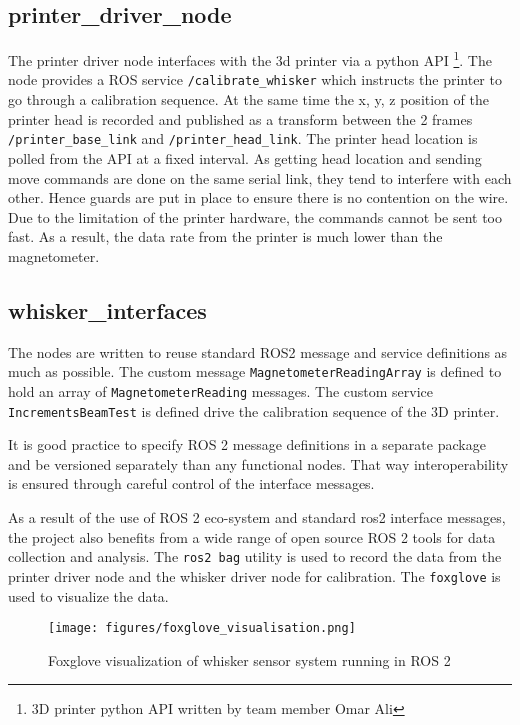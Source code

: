 \documentclass{article}
\begin{document}
\subsection{printer\_driver\_node}

The printer driver node interfaces with the 3d printer via a python API \footnote{3D printer python API written by team member Omar Ali}. The node provides a ROS service \verb|/calibrate_whisker| which instructs the printer to go through a calibration sequence. At the same time the x, y, z position of the printer head is recorded and published as a transform between the 2 frames \verb|/printer_base_link| and \verb|/printer_head_link|. The printer head location is polled from the API at a fixed interval. As getting head location and sending move commands are done on the same serial link, they tend to interfere with each other. Hence guards are put in place to ensure there is no contention on the wire. Due to the limitation of the printer hardware, the commands cannot be sent too fast. As a result, the data rate from the printer is much lower than the magnetometer.

\subsection{whisker\_interfaces}

The nodes are written to reuse standard ROS2 message and service definitions as much as possible. The custom message \verb|MagnetometerReadingArray| is defined to hold an array of \verb|MagnetometerReading| messages. The custom service \verb|IncrementsBeamTest| is defined drive the calibration sequence of the 3D printer.

It is good practice to specify ROS 2 message definitions in a separate package and be versioned separately than any functional nodes. That way interoperability is ensured through careful control of the interface messages.

As a result of the use of ROS 2 eco-system and standard ros2 interface messages, the project also benefits from a wide range of open source ROS 2 tools for data collection and analysis. The \verb|ros2 bag| utility is used to record the data from the printer driver node and the whisker driver node for calibration. The \verb|foxglove| is used to visualize the data.

\begin{figure}
    \centering
    \texttt{[image: figures/foxglove\_visualisation.png]}
    \caption{Foxglove visualization of whisker sensor system running in ROS 2}
    \label{fig:foxglove}
\end{figure}
\end{document}
